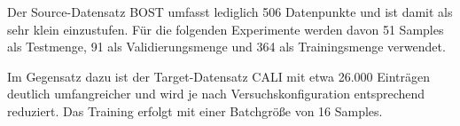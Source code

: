 Der Source-Datensatz BOST umfasst lediglich 506 Datenpunkte und ist damit als sehr klein einzustufen. Für die folgenden Experimente werden davon 
51 Samples als Testmenge, 91 als Validierungsmenge und 364 als Trainingsmenge verwendet.

Im Gegensatz dazu ist der Target-Datensatz CALI mit etwa 26.000 Einträgen deutlich umfangreicher und wird je nach Versuchskonfiguration 
entsprechend reduziert. Das Training erfolgt mit einer Batchgröße von 16 Samples.
